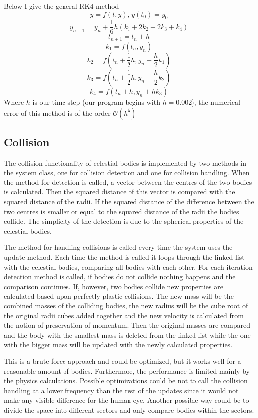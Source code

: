 \documentclass[a4paper,12pt]{article}
\begin{document}
Below I give the general RK4-method
\[
\dot{y}=f(t,y),\,y(t_0)=y_0
\]
\[
y_{n+1} = y_n + \frac{1}{6}h\left( k_1 + 2k_2 + 2k_3 + k_4\right)
\]
\[
t_{n+1} = t_n +h
\]
\[
k_1 = f(t_n,y_n)
\]
\[
k_2 = f(t_n + \frac{1}{2}h,y_n + \frac{h}{2}k_1)
\]
\[
k_3 = f(t_n + \frac{1}{2}h,y_n + \frac{h}{2}k_2)
\]
\[
k_4 = f(t_n + h,y_n + hk_3)
\]
Where $h$ is our time-step (our program begins with $h = 0.002$), the numerical
error of this method is of the order $\mathcal{O}(h^5)$

\subsection{Collision}
The collision functionality of celestial bodies is implemented by two methods
in the system class, one for collision detection and one for collision
handling. When the method for detection is called, a vector
between the centres of the two bodies is calculated. Then the squared distance
of this vector is compared with the squared distance of the radii. If the
squared distance of the difference between the two centres is smaller or equal
to the squared distance of the radii the bodies collide.
The simplicity of the detection is due to the spherical properties of the
celestial bodies.

The method for handling collisions is called
every time the system uses the update method. Each time the method is called it
loops through the linked list with the celestial bodies, comparing all bodies
with each other. For each iteration detection method is called, if bodies
do not collide nothing happens and the comparison continues. If, however, two
bodies collide new properties are calculated based upon perfectly-plastic
collisions. The new mass will be the combined masses of the colliding bodies,
the new radius will be the cube root of the original radii cubes added together
and the new velocity is calculated from the notion of preservation of momentum.
Then the original masses are compared and the body with the smallest mass is
deleted from the linked list while the one with the bigger mass will be updated
with the newly calculated properties.

This is a brute force approach and could be optimized, but it works well for a
reasonable amount of bodies. Furthermore, the performance is limited mainly by
the physics calculations. Possible optimizations could be not to call the
collision handling at a lower frequency than the rest of the updates since it
would not make any visible difference for the human eye. Another possible way
could be to divide the space into different sectors and only compare bodies
within the sectors. 
\end{document}
